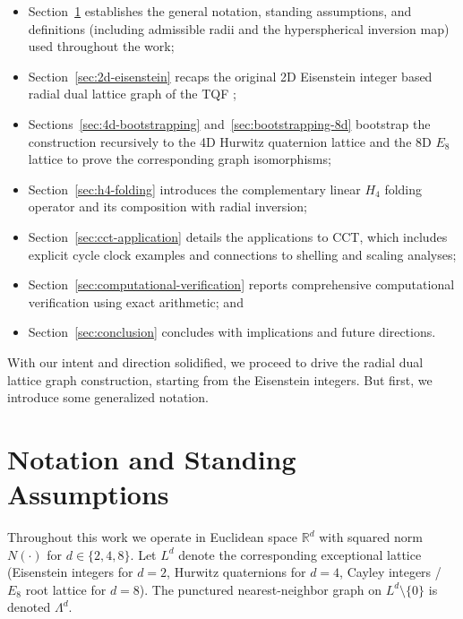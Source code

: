 \documentclass{article}
\begin{document}
\begin{itemize}
\item Section~\ref{sec:notation} establishes the general notation, standing assumptions, and definitions (including admissible radii and the hyperspherical inversion map) used throughout the work;
 \item Section~\ref{sec:2d-eisenstein} recaps the original 2D Eisenstein integer based radial dual lattice graph of the TQF \cite{Schmidt2025};
 \item Sections~\ref{sec:4d-bootstrapping} and~\ref{sec:bootstrapping-8d} bootstrap the construction recursively to the 4D Hurwitz quaternion lattice and the 8D $E_8$ lattice to prove the corresponding graph isomorphisms;
 \item Section~\ref{sec:h4-folding} introduces the complementary linear $H_4$ folding operator and its composition with radial inversion;
 \item Section~\ref{sec:cct-application} details the applications to CCT, which includes explicit cycle clock examples and connections to shelling and scaling analyses;
 \item Section~\ref{sec:computational-verification} reports comprehensive computational verification using exact arithmetic; and
 \item Section~\ref{sec:conclusion} concludes with implications and future directions.
\end{itemize}

With our intent and direction solidified, we proceed to drive the radial dual lattice graph construction, starting from the Eisenstein integers. But first, we introduce some generalized notation.

\section{Notation and Standing Assumptions}
\label{sec:notation}

Throughout this work we operate in Euclidean space $\mathbb{R}^d$ with squared norm $N(\cdot)$ for $d \in \{2,4,8\}$. Let $L^d$ denote the corresponding exceptional lattice (Eisenstein integers for $d=2$, Hurwitz quaternions for $d=4$, Cayley integers / $E_8$ root lattice for $d=8$). The punctured nearest-neighbor graph on $L^d \setminus \{0\}$ is denoted $\Lambda^d$.
\end{document}
